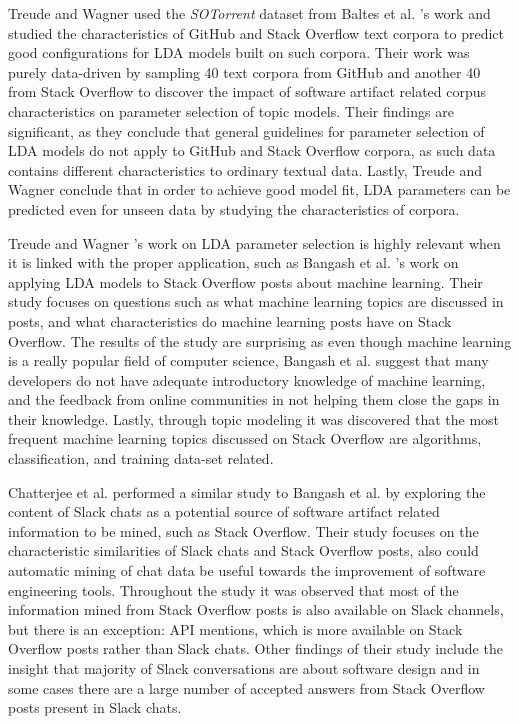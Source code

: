         Treude and Wagner \cite{treude2019predicting} used the \emph{SOTorrent} dataset from Baltes et al. \cite{baltes2019sotorrent}'s work and studied the characteristics of GitHub and Stack Overflow text corpora to predict good configurations for LDA models built on such corpora. Their work was purely data-driven by sampling 40 text corpora from GitHub and another 40 from Stack Overflow to discover the impact of software artifact related corpus characteristics on parameter selection of topic models. Their findings are significant, as they conclude that general guidelines for parameter selection of LDA models do not apply to GitHub and Stack Overflow corpora, as such data contains different characteristics to ordinary textual data. Lastly, Treude and Wagner conclude that in order to achieve good model fit, LDA parameters can be predicted even for unseen data by studying the characteristics of corpora.
        
         Treude and Wagner \cite{treude2019predicting}'s work on LDA parameter selection is highly relevant when it is linked with the proper application, such as Bangash et al. \cite{bangash2019developers}'s work on applying LDA models to Stack Overflow posts about machine learning. Their study focuses on questions such as what machine learning topics are discussed in posts, and what characteristics do machine learning posts have on Stack Overflow. The results of the study are surprising as even though machine learning is a really popular field of computer science, Bangash et al. suggest that many developers do not have adequate introductory knowledge of machine learning, and the feedback from online communities in not helping them close the gaps in their knowledge. Lastly, through topic modeling it was discovered that the most frequent machine learning topics discussed on Stack Overflow are algorithms, classification, and training data-set related.
         
        Chatterjee et al. \cite{chatterjee2019exploratory} performed a similar study to Bangash et al. \cite{bangash2019developers} by exploring the content of Slack chats as a potential source of software artifact related information to be mined, such as Stack Overflow. Their study focuses on the characteristic similarities of Slack chats and Stack Overflow posts, also could automatic mining of chat data be useful towards the improvement of software engineering tools. Throughout the study it was observed that most of the information mined from Stack Overflow posts is also available on Slack channels, but there is an exception: API mentions, which is more available on Stack Overflow posts rather than Slack chats. Other findings of their study include the insight that majority of Slack conversations are about software design and in some cases there are a large number of accepted answers from Stack Overflow posts present in Slack chats.
         
